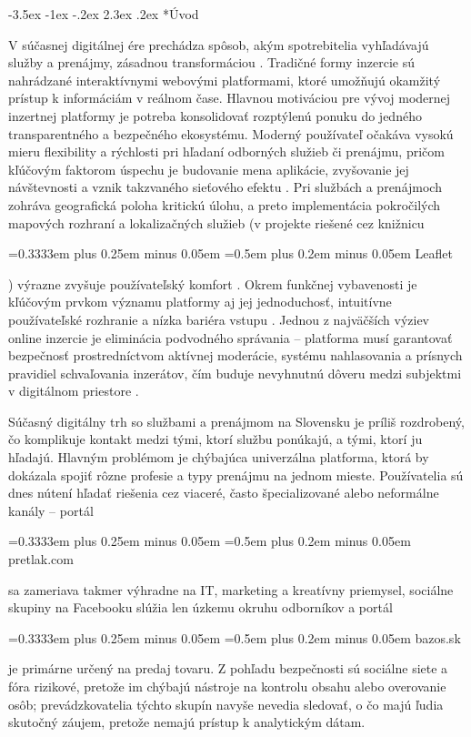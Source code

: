 \documentclass[12pt]{article}
\makeatletter
\newcommand{\hlcode}[1]{%
  \allowbreak
  \begingroup
  \setlength{\fboxsep}{2.4pt}%
  \setlength{\fboxrule}{0pt}%
  \colorbox{gray!15}{%
    \strut
    {\ttfamily\small
     \hyphenpenalty=10000
     \exhyphenpenalty=10000
     \spaceskip=0.3333em plus 0.25em minus 0.05em
     \xspaceskip=0.5em plus 0.2em minus 0.05em
     #1}%
  }%
  \endgroup
  \allowbreak
}
\renewcommand{\section}{\@startsection{section}{1}{\z@}%
  {-3.5ex \@plus -1ex \@minus -.2ex}%
  {2.3ex \@plus.2ex}%
  {\normalfont\large\bfseries}}
\makeatother
\begin{document}
\section*{Úvod}
\noindent
V súčasnej digitálnej ére prechádza spôsob, akým spotrebitelia vyhľadávajú služby a prenájmy, zásadnou transformáciou \parencite{vallas2020platforms}. Tradičné formy inzercie sú nahrádzané interaktívnymi webovými platformami, ktoré umožňujú okamžitý prístup k informáciám v reálnom čase. Hlavnou motiváciou pre vývoj modernej inzertnej platformy je potreba konsolidovať rozptýlenú ponuku do jedného transparentného a bezpečného ekosystému. Moderný používateľ očakáva vysokú mieru flexibility a rýchlosti pri hľadaní odborných služieb či prenájmu, pričom kľúčovým faktorom úspechu je budovanie mena aplikácie, zvyšovanie jej návštevnosti a vznik takzvaného sieťového efektu \parencite{rochet2003platform}. Pri službách a prenájmoch zohráva geografická poloha kritickú úlohu, a preto implementácia pokročilých mapových rozhraní a lokalizačných služieb (v projekte riešené cez knižnicu \hlcode{Leaflet}) výrazne zvyšuje používateľský komfort \parencite{obe2017postgresql}. Okrem funkčnej vybavenosti je kľúčovým prvkom významu platformy aj jej jednoduchosť, intuitívne používateľské rozhranie a nízka bariéra vstupu \parencite{riva2022nextjs}. Jednou z najväčších výziev online inzercie je eliminácia podvodného správania -- platforma musí garantovať bezpečnosť prostredníctvom aktívnej moderácie, systému nahlasovania a prísnych pravidiel schvaľovania inzerátov, čím buduje nevyhnutnú dôveru medzi subjektmi v digitálnom priestore \parencite{hoffman2020websec, sundararajan2014peer}.

Súčasný digitálny trh so službami a prenájmom na Slovensku je príliš rozdrobený, čo komplikuje kontakt medzi tými, ktorí službu ponúkajú, a tými, ktorí ju hľadajú. Hlavným problémom je chýbajúca univerzálna platforma, ktorá by dokázala spojiť rôzne profesie a typy prenájmu na jednom mieste. Používatelia sú dnes nútení hľadať riešenia cez viaceré, často špecializované alebo neformálne kanály -- portál \hlcode{pretlak.com} sa zameriava takmer výhradne na IT, marketing a kreatívny priemysel, sociálne skupiny na Facebooku slúžia len úzkemu okruhu odborníkov a portál \hlcode{bazos.sk} je primárne určený na predaj tovaru. Z pohľadu bezpečnosti sú sociálne siete a fóra rizikové, pretože im chýbajú nástroje na kontrolu obsahu alebo overovanie osôb; prevádzkovatelia týchto skupín navyše nevedia sledovať, o čo majú ľudia skutočný záujem, pretože nemajú prístup k analytickým dátam.
\end{document}
